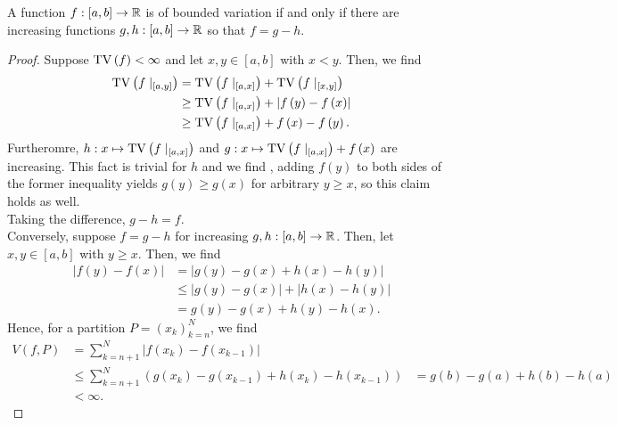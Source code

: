 \begin{theorem}
A function \(f:\left[ a, b \right]  \to \mathbb{R}\) 	is of bounded variation if and only if there are increasing functions \(g, h: \left[ a, b \right]  \to \mathbb{R}\) so that \(f = g - h\).
\end{theorem}
\begin{proof}
	Suppose \(\operatorname{TV}\left( f \right) < \infty\) and let \(x, y \in \left[ a, b \right] \) with \(x < y\). Then, we find
	\begin{align*}
		\operatorname{TV}\left( f\mid_{\left[ a, y \right] } \right) &= \operatorname{TV}\left( f\mid_{\left[ a, x \right] } \right)   + \operatorname{TV}\left( f\mid_{\left[ x, y \right] } \right) \\
							       &\ge \operatorname{TV}\left( f\mid_{\left[ a, x \right] } \right) + \left| f\left( y \right)  - f\left( x \right)  \right| \\
							       &\ge \operatorname{TV}\left( f\mid_{\left[ a, x \right] } \right) + f\left( x \right)  - f\left( y \right)
	.\end{align*}
	Furtheromre, \(h: x \mapsto \operatorname{TV}\left( f\mid_{\left[ a, x \right] } \right)\) and \(g: x \mapsto \operatorname{TV}\left( f\mid_{\left[ a, x \right] } \right) + f\left( x \right)  \) are increasing. This fact is trivial for \(h\) and we find , adding \(f\left( y \right) \) to both sides of the former inequality yields \(g\left( y \right)  \ge g\left( x \right) \) for arbitrary \(y \ge x\), so this claim holds as well.\\
	Taking the difference, \(g - h = f\).\\
	Conversely, suppose \(f = g - h\) for increasing \(g, h : \left[ a, b \right]  \to \mathbb{R}\). Then, let \(x, y \in \left[ a, b \right] \) with \(y \ge x\). Then, we find
	\begin{align*}
		\left| f\left( y \right) - f\left( x \right)   \right| &=  \left| g\left( y \right) - g\left( x \right) + h\left( x \right) - h\left( y \right)     \right|  \\
								       &\le \left| g\left( y \right) - g\left( x \right)   \right| + \left| h\left( x \right) - h\left( y \right)   \right| \\
								       &= g\left( y \right) - g\left( x \right)  + h\left( y \right) - h\left( x \right)
	.\end{align*}
	Hence, for a partition \(P = \left( x_{k} \right) _{k = n}^{N}\), we find
	\begin{align*}
		V\left( f, P \right)  &= \sum_{k=n + 1}^{N} \left| f\left( x_{k} \right) - f\left( x_{k-1} \right)   \right|  \\
				      &\le \sum_{k=n+1}^{N} \left( g\left( x_{k} \right)  - g\left( x_{k-1} \right)  + h\left( x_{k} \right) - h\left( x_{k-1} \right)   \right)
				      &= g\left( b \right) - g\left( a \right)  + h\left( b \right) - h\left( a \right) \\
				      &< \infty
	.\end{align*}
\end{proof}
